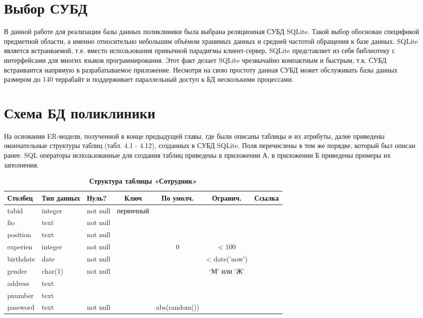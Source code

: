 \documentclass[14pt,a4paper,russian]{extreport}
\begin{document}
\section{Выбор СУБД}
В данной работе для реализации базы данных поликлиники была выбрана реляционная СУБД
SQLite. Такой выбор обоснован спецификой предметной области, а именно относительно небольшим
объёмом хранимых данных и средней частотой обращения к базе данных. SQLite является
встраиваемой, т.е. вместо использования привычной парадигмы клиент-сервер, SQLite представляет из
себя библиотеку с интерфейсами для многих языков программирования. Этот факт делает SQLite
чрезвычайно компактным и быстрым, т.к. СУБД встраиваится напрямую в разрабатываемое приложение.
Несмотря на свою простоту данная СУБД может обслуживать базы данных размером до 140 террабайт и
поддерживает параллельный доступ к БД несколькими процессами. \cite{sqlite}


\section{Схема БД поликлиники}
На основании ER-модели, полученной в конце предыдущей главы, где были описаны таблицы и их атрибуты,
далее приведены окончательные структуры таблиц (табл. 4.1 - 4.12), созданных в СУБД SQLite. Поля перечислены в
том же порядке, который был описан ранее. SQL операторы
использованные для создания таблиц приведены в приложении А, в приложении Б приведены примеры их
заполнения.


\begin{table}[h!]
    \caption{ } 
    \begin{subtable}[t]{\textwidth}
        \caption{\textbf{Структура таблицы «Сотрудник»}}
    \begin{tabularx}{\textwidth}{| X | X | X | c | c | c | X |}
        \hline
        \textbf{Столбец} & \textbf{Тип данных} & \textbf{Нуль?} & \textbf{Ключ} & \textbf{По
        умолч.} & \textbf{Огранич.} & \textbf{Ссылка} \\ \hline
        tabid & integer & not null & первичный & & &  \\ \hline
        fio & text & not null & & & & \\ \hline
        position & text & not null & & & & \\ \hline
        experien & integer & not null & & 0 & < 100 & \\ \hline
        birthdate & date & not null & & & < date('now') & \\ \hline
        gender & char(1) & not null & & & `М' или `Ж' & \\ \hline
        address & text & & & & & \\ \hline
        pnumber & text & & & & & \\ \hline
        password & text & not null & & abs(random()) & & \\ \hline
    \end{tabularx}
    \end{subtable}
    \label{table:emp}
\end{table}
\end{document}
